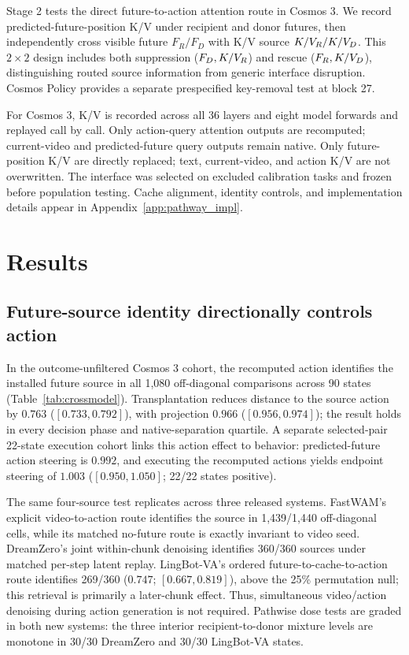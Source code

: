 Stage 2 tests the direct future-to-action attention route in Cosmos 3. We record predicted-future-position K/V under recipient and donor futures, then independently cross visible future $F_R/F_D$ with K/V source $K/V_R/K/V_D$. This $2\times2$ design includes both suppression ($F_D,K/V_R$) and rescue ($F_R,K/V_D$), distinguishing routed source information from generic interface disruption. Cosmos Policy provides a separate prespecified key-removal test at block 27.

For Cosmos 3, K/V is recorded across all 36 layers and eight model forwards and replayed call by call. Only action-query attention outputs are recomputed; current-video and predicted-future query outputs remain native. Only future-position K/V are directly replaced; text, current-video, and action K/V are not overwritten. The interface was selected on excluded calibration tasks and frozen before population testing. Cache alignment, identity controls, and implementation details appear in Appendix~\ref{app:pathway_impl}.

\section{Results}
\label{sec:results}

\subsection{Future-source identity directionally controls action}
\label{sec:steering}

In the outcome-unfiltered Cosmos 3 cohort, the recomputed action identifies the installed future source in all 1,080 off-diagonal comparisons across 90 states (Table~\ref{tab:crossmodel}). Transplantation reduces distance to the source action by $0.763$ ($[0.733,0.792]$), with projection $0.966$ ($[0.956,0.974]$); the result holds in every decision phase and native-separation quartile. A separate selected-pair 22-state execution cohort links this action effect to behavior: predicted-future action steering is $0.992$, and executing the recomputed actions yields endpoint steering of $1.003$ ($[0.950,1.050]$; 22/22 states positive).

The same four-source test replicates across three released systems. FastWAM's explicit video-to-action route identifies the source in 1,439/1,440 off-diagonal cells, while its matched no-future route is exactly invariant to video seed. DreamZero's joint within-chunk denoising identifies 360/360 sources under matched per-step latent replay. LingBot-VA's ordered future-to-cache-to-action route identifies 269/360 ($0.747$; $[0.667,0.819]$), above the 25\% permutation null; this retrieval is primarily a later-chunk effect. Thus, simultaneous video/action denoising during action generation is not required. Pathwise dose tests are graded in both new systems: the three interior recipient-to-donor mixture levels are monotone in 30/30 DreamZero and 30/30 LingBot-VA states.

